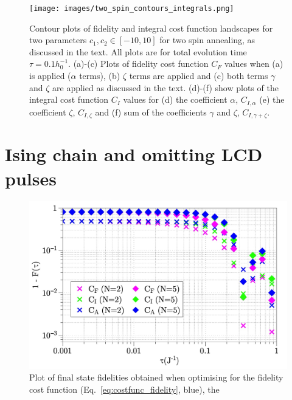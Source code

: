 \begin{figure}[h]
    \centering
    \texttt{[image: images/two\_spin\_contours\_integrals.png]} \caption[Two-spin annealing contour plots for final state fidelity and AGP integral cost function values.]{Contour plots of fidelity and  integral cost function landscapes for two parameters $c_1, c_2 \in [-10, 10]$ for two spin annealing, as discussed in the text. All plots are for total evolution time $\tau = 0.1 h_0^{-1}$. (a)-(c) Plots of fidelity cost function $C_F$ values when (a)   is applied ($\alpha$ terms), (b)   $\zeta$ terms are applied and (c) both   terms $\gamma$ and $\zeta$ are applied as discussed in the text. (d)-(f) show plots of the integral cost function $C_I$ values for (d) the coefficient $\alpha$, $C_{I, \alpha}$ (e) the coefficient $\zeta$, $C_{I, \zeta}$ and (f) sum of the coefficients $\gamma$ and $\zeta$, $C_{I, \gamma + \zeta}$.}\label{fig:two_spin_higher_order}
\end{figure}

\section{Ising chain and omitting LCD pulses}

\begin{figure}[h]
    \centering
    \includegraphics[width=0.8\linewidth]{images/No_cd_higher_order.jpg} \caption[Plot of final state fidelity for the Ising spin chain for different cost functions and no LCD.]{Plot of final state fidelities obtained when optimising for the fidelity cost function (Eq.~\eqref{eq:costfunc_fidelity}, blue), the   }\label{fig:ising_nocd_higher_order}
\end{figure}

